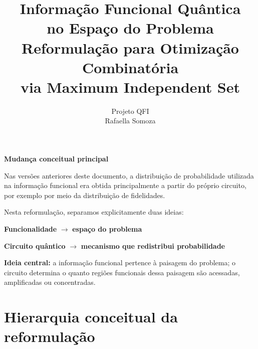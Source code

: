 \documentclass[11pt,a4paper]{article}
\title{
    \vspace{-1cm}
    \textbf{\color{mainblue}
    Informação Funcional Quântica\\[0.2cm]
    no Espaço do Problema}
    \\[0.4cm]
    \large
    Reformulação para Otimização Combinatória\\
    via Maximum Independent Set
}
\author{
    Projeto QFI\\
    \small Rafaella Somoza
}
\date{}
\begin{document}
\maketitle

\begin{mainidea}

\textbf{Mudança conceitual principal}

Nas versões anteriores deste documento, a distribuição de probabilidade
utilizada na informação funcional era obtida principalmente a partir
do próprio circuito, por exemplo por meio da distribuição de fidelidades.

Nesta reformulação, separamos explicitamente duas ideias:

\begin{center}
\textbf{Funcionalidade}
\quad $\longrightarrow$ \quad
\textbf{espaço do problema}
\end{center}

\begin{center}
\textbf{Circuito quântico}
\quad $\longrightarrow$ \quad
\textbf{mecanismo que redistribui probabilidade}
\end{center}

\textbf{Ideia central:}
a informação funcional pertence à paisagem do problema;
o circuito determina o quanto regiões funcionais dessa paisagem
são acessadas, amplificadas ou concentradas.

\end{mainidea}

\tableofcontents

\newpage

\section{Hierarquia conceitual da reformulação}
\end{document}
